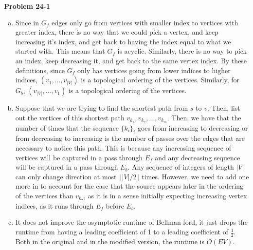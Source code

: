\documentclass{article}
\begin{document}
\noindent\textbf{Problem 24-1}\\
\begin{enumerate}[a.]
\item
Since in $G_f$ edges only go from vertices with smaller index to vertices with greater index, there is no way that we could pick a vertex, and keep increasing it's index, and get back to having the index equal to what we started with. This means that $G_f$ is acyclic. Similarly, there is no way to pick an index, keep decreasing it, and get back to the same vertex index. By these definitions, since $G_f$ only has vertices going from lower indices to higher indices, $(v_1, \ldots,v_{|V|})$ is a topological ordering of the vertices. Similarly, for $G_b$, $(v_{|V|},\ldots,v_1)$ is a topological ordering of the vertices.

\item
Suppose that we are trying to find the shortest path from $s$ to $v$. Then, list out the vertices of this shortest path $v_{k_1}, v_{k_2}, \ldots, v_{k_m}$. Then, we have that the number of times that the sequence $\{k_i\}_i$ goes from increasing to decreasing or from decreasing to increasing is the number of passes over the edges that are necessary to notice this path. This is because any increasing sequence of vertices will be captured in a pass through $E_f$ and any decreasing sequence will be captured in a pass through $E_b$. Any sequence of integers of length $|V|$ can only change direction at most $\lfloor |V|/2\rfloor$ times. However, we need to add one more in to account for the case that the source appears later in the ordering of the vertices than $v_{k_2}$, as it is in a sense initially expecting increasing vertex indices, as it runs through $E_f$ before $E_b$.

\item
It does not improve the asymptotic runtime of Bellman ford, it just drops the runtime from having a leading coefficient of 1 to a leading coefficient of $\frac{1}{2}$. Both in the original and in the modified version, the runtime is $O(EV)$.
\end{enumerate}
\end{document}
